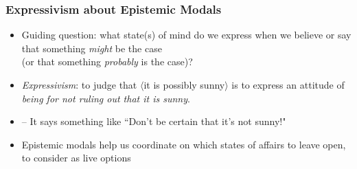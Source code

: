 \begin{frame}
\frametitle{Expressivism about Epistemic Modals}

\begin{itemize}[<+->]

\item Guiding question: what state(s) of mind do we express when we believe or say that something \textit{might} be the case \\ (or that something \textit{probably} is the case)?


\item \emph{Expressivism}: to judge that $\langle$it is possibly sunny$\rangle$ is to express an attitude of \textit{being for not ruling out that it is sunny}. 

\item[] -- It says something like ``Don't be certain that it's not sunny!"



\item Epistemic modals help us coordinate on which states of affairs to leave open, to consider as live options


\end{itemize}
\end{frame}



